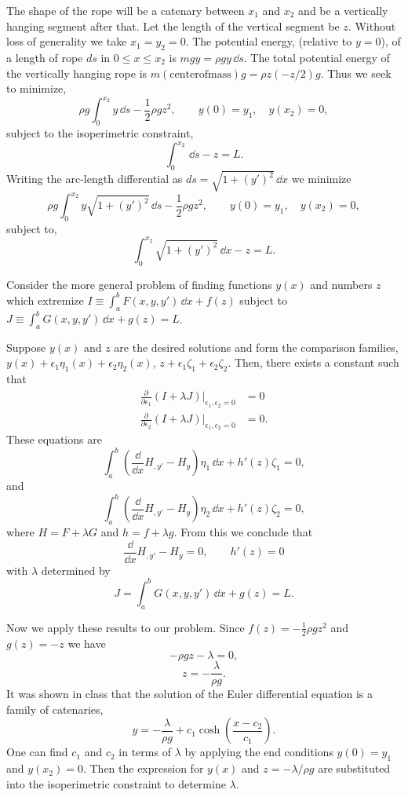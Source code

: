 \begin{Solution}
  The shape of the rope will be a catenary between $x_1$ and $x_2$ and be
  a vertically hanging segment after that.  Let the length of the 
  vertical segment be $z$.
  Without loss of generality we take $x_1 = y_2 = 0$.  The potential 
  energy, (relative to $y = 0$), of a length of rope $d s$ in $0 \leq x \leq x_2$
  is $m g y = \rho g y\,\dd s$.  The total potential energy of the 
  vertically hanging rope is $m (\mathrm{center of mass}) g = \rho z (-z/2) g$.
  Thus we seek to minimize,
  \[
  \rho g \int_0^{x_2} y \,\dd s - \frac{1}{2} \rho g z^2, \qquad
  y(0) = y_1, \quad y(x_2) = 0,
  \]
  subject to the isoperimetric constraint,
  \[
  \int_0^{x_2}\,\dd s - z = L.
  \]
  Writing the arc-length differential as $d s = \sqrt{1 + (y')^2}\,\dd x$ we 
  minimize
  \[
  \rho g \int_0^{x_2} y \sqrt{1 + (y')^2} \,\dd s - \frac{1}{2} \rho g z^2, \qquad
  y(0) = y_1, \quad y(x_2) = 0,
  \]
  subject to,
  \[
  \int_0^{x_2} \sqrt{1 + (y')^2} \,\dd x - z = L.
  \]



  Consider the more general problem of finding functions $y(x)$ and numbers
  $z$ which extremize $I \equiv \int_a^b F(x, y, y')\,\dd x + f(z)$ subject
  to $J \equiv \int_a^b G(x, y, y')\,\dd x + g(z) = L$.

  Suppose $y(x)$ and $z$ are the desired solutions and form the comparison
  families, $y(x) + \epsilon_1 \eta_1(x) + \epsilon_2 \eta_2(x)$, 
  $z + \epsilon_1 \zeta_1 + \epsilon_2 \zeta_2$.  Then, there exists a 
  constant such that
  \begin{align*}
    \frac{\partial}{\partial \epsilon_1} (I + \lambda J) \big|_{\epsilon_1,\epsilon_2=0} &= 0 \\
    \frac{\partial}{\partial \epsilon_2} (I + \lambda J) \big|_{\epsilon_1,\epsilon_2=0} &= 0.
  \end{align*}
  These equations are
  \[
  \int_a^b \left( \frac{\dd}{\dd x} H_{,y'} - H_y \right) \eta_1 \,\dd x
  + h'(z) \zeta_1 = 0,
  \]
  and
  \[
  \int_a^b \left( \frac{\dd}{\dd x} H_{,y'} - H_y \right) \eta_2 \,\dd x
  + h'(z) \zeta_2 = 0,
  \]
  where $H = F + \lambda G$ and $h = f + \lambda g$.  From this we conclude
  that
  \[
  \frac{\dd}{\dd x} H_{,y'} - H_y = 0, \qquad h'(z) = 0
  \]
  with $\lambda$ determined by 
  \[
  J = \int_a^b G(x,y,y')\,\dd x + g(z) = L.
  \]


  Now we apply these results to our problem.  Since 
  $f(z) =  - \frac{1}{2} \rho g z^2$ and
  $g(z) = - z$ we have
  \[
  - \rho g z - \lambda = 0,
  \]
  \[
  \boxed{
    z = - \frac{\lambda}{\rho g}.
    }
  \]
  It was shown in class that the solution of the Euler differential equation
  is a family of catenaries,
  \[
  y = - \frac{\lambda}{\rho g} + c_1 \cosh \left( \frac{x - c_2}{c_1} \right).
  \]
  One can find $c_1$ and $c_2$ in terms of $\lambda$ by applying the
  end conditions $y(0) = y_1$ and $y(x_2) = 0$.  Then the expression 
  for $y(x)$ and $z = - \lambda / \rho g$ are substituted into the 
  isoperimetric constraint to determine $\lambda$.



\end{Solution}
